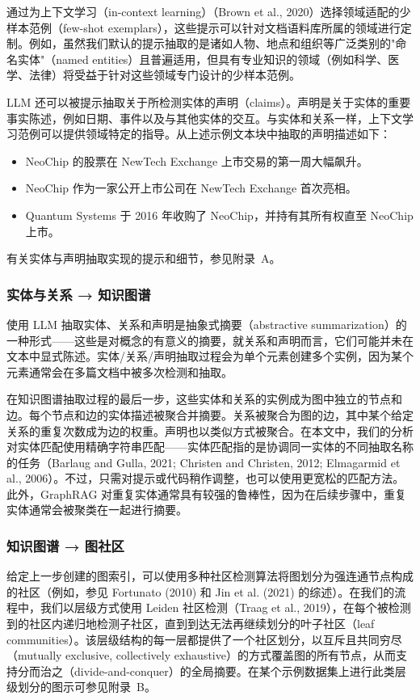 \documentclass[11pt,UTF8,fontset=fandol]{ctexart}
\begin{document}
通过为上下文学习（in-context learning）（Brown et al., 2020）选择领域适配的少样本范例（few-shot exemplars），这些提示可以针对文档语料库所属的领域进行定制。例如，虽然我们默认的提示抽取的是诸如人物、地点和组织等广泛类别的"命名实体"（named entities）且普遍适用，但具有专业知识的领域（例如科学、医学、法律）将受益于针对这些领域专门设计的少样本范例。

LLM 还可以被提示抽取关于所检测实体的声明（claims）。声明是关于实体的重要事实陈述，例如日期、事件以及与其他实体的交互。与实体和关系一样，上下文学习范例可以提供领域特定的指导。从上述示例文本块中抽取的声明描述如下：

\begin{itemize}[leftmargin=2em]
\item NeoChip 的股票在 NewTech Exchange 上市交易的第一周大幅飙升。
\item NeoChip 作为一家公开上市公司在 NewTech Exchange 首次亮相。
\item Quantum Systems 于 2016 年收购了 NeoChip，并持有其所有权直至 NeoChip 上市。
\end{itemize}

有关实体与声明抽取实现的提示和细节，参见附录~A。

\subsubsection{实体与关系 → 知识图谱}

使用 LLM 抽取实体、关系和声明是抽象式摘要（abstractive summarization）的一种形式——这些是对概念的有意义的摘要，就关系和声明而言，它们可能并未在文本中显式陈述。实体/关系/声明抽取过程会为单个元素创建多个实例，因为某个元素通常会在多篇文档中被多次检测和抽取。

在知识图谱抽取过程的最后一步，这些实体和关系的实例成为图中独立的节点和边。每个节点和边的实体描述被聚合并摘要。关系被聚合为图的边，其中某个给定关系的重复次数成为边的权重。声明也以类似方式被聚合。在本文中，我们的分析对实体匹配使用精确字符串匹配——实体匹配指的是协调同一实体的不同抽取名称的任务（Barlaug and Gulla, 2021; Christen and Christen, 2012; Elmagarmid et al., 2006）。不过，只需对提示或代码稍作调整，也可以使用更宽松的匹配方法。此外，GraphRAG 对重复实体通常具有较强的鲁棒性，因为在后续步骤中，重复实体通常会被聚类在一起进行摘要。

\subsubsection{知识图谱 → 图社区}

给定上一步创建的图索引，可以使用多种社区检测算法将图划分为强连通节点构成的社区（例如，参见 Fortunato (2010) 和 Jin et al. (2021) 的综述）。在我们的流程中，我们以层级方式使用 Leiden 社区检测（Traag et al., 2019），在每个被检测到的社区内递归地检测子社区，直到到达无法再继续划分的叶子社区（leaf communities）。该层级结构的每一层都提供了一个社区划分，以互斥且共同穷尽（mutually exclusive, collectively exhaustive）的方式覆盖图的所有节点，从而支持分而治之（divide-and-conquer）的全局摘要。在某个示例数据集上进行此类层级划分的图示可参见附录~B。
\end{document}
